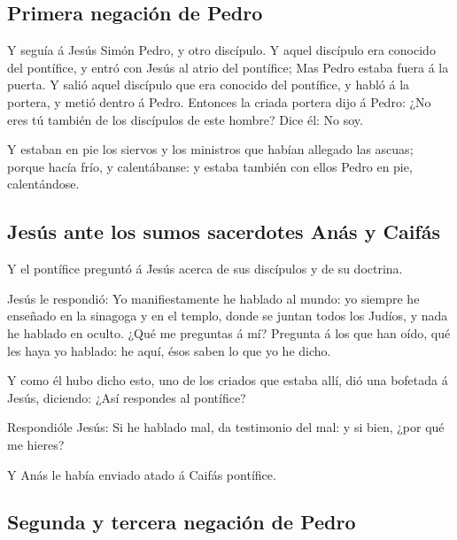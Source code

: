 \hypertarget{primera-negaciuxf3n-de-pedro}{%
\subsection{Primera negación de
Pedro}\label{primera-negaciuxf3n-de-pedro}}

 Y seguía á Jesús Simón Pedro, y otro discípulo. Y aquel
discípulo era conocido del pontífice, y entró con Jesús al atrio del
pontífice;  Mas Pedro estaba fuera á la puerta. Y salió
aquel discípulo que era conocido del pontífice, y habló á la portera, y
metió dentro á Pedro.  Entonces la criada portera dijo á
Pedro: ¿No eres tú también de los discípulos de este hombre? Dice él: No
soy.

 Y estaban en pie los siervos y los ministros que habían
allegado las ascuas; porque hacía frío, y calentábanse: y estaba también
con ellos Pedro en pie, calentándose.

\hypertarget{jesuxfas-ante-los-sumos-sacerdotes-anuxe1s-y-caifuxe1s}{%
\subsection{Jesús ante los sumos sacerdotes Anás y
Caifás}\label{jesuxfas-ante-los-sumos-sacerdotes-anuxe1s-y-caifuxe1s}}

 Y el pontífice preguntó á Jesús acerca de sus discípulos
y de su doctrina.

 Jesús le respondió: Yo manifiestamente he hablado al
mundo: yo siempre he enseñado en la sinagoga y en el templo, donde se
juntan todos los Judíos, y nada he hablado en oculto. 
¿Qué me preguntas á mí? Pregunta á los que han oído, qué les haya yo
hablado: he aquí, ésos saben lo que yo he dicho.

 Y como él hubo dicho esto, uno de los criados que estaba
allí, dió una bofetada á Jesús, diciendo: ¿Así respondes al pontífice?

 Respondióle Jesús: Si he hablado mal, da testimonio del
mal: y si bien, ¿por qué me hieres?

 Y Anás le había enviado atado á Caifás pontífice.

\hypertarget{segunda-y-tercera-negaciuxf3n-de-pedro}{%
\subsection{Segunda y tercera negación de
Pedro}\label{segunda-y-tercera-negaciuxf3n-de-pedro}}

